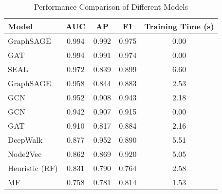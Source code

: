 \begin{table}[!t]
\caption{Performance Comparison of Different Models}
\label{table_performance}
\centering
\begin{tabular}{lcccc}
\toprule
\textbf{Model} & \textbf{AUC} & \textbf{AP} & \textbf{F1} & \textbf{Training Time (s)} \\
\midrule
GraphSAGE & 0.994 & 0.992 & 0.975 & 0.00 \\
GAT & 0.994 & 0.991 & 0.974 & 0.00 \\
SEAL & 0.972 & 0.839 & 0.899 & 6.60 \\
GraphSAGE & 0.958 & 0.844 & 0.883 & 2.53 \\
GCN & 0.952 & 0.908 & 0.943 & 2.18 \\
GCN & 0.942 & 0.907 & 0.915 & 0.00 \\
GAT & 0.910 & 0.817 & 0.884 & 2.16 \\
DeepWalk & 0.877 & 0.952 & 0.890 & 5.51 \\
Node2Vec & 0.862 & 0.869 & 0.920 & 5.05 \\
Heuristic (RF) & 0.831 & 0.790 & 0.764 & 2.58 \\
MF & 0.758 & 0.781 & 0.814 & 1.53 \\
\bottomrule
\end{tabular}
\end{table}
